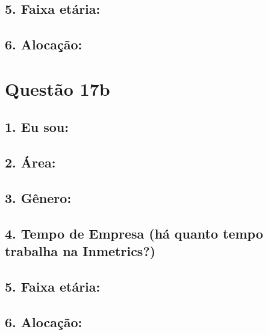 \documentclass[]{book}
\begin{document}
\hypertarget{faixa-etaria-35}{%
\subsection{5. Faixa etária:}\label{faixa-etaria-35}}

\hypertarget{alocacao-35}{%
\subsection{6. Alocação:}\label{alocacao-35}}

\hypertarget{questao-17b}{%
\section{Questão 17b}\label{questao-17b}}

\hypertarget{eu-sou-36}{%
\subsection{1. Eu sou:}\label{eu-sou-36}}

\hypertarget{area-36}{%
\subsection{2. Área:}\label{area-36}}

\hypertarget{genero-36}{%
\subsection{3. Gênero:}\label{genero-36}}

\hypertarget{tempo-de-empresa-ha-quanto-tempo-trabalha-na-inmetrics-36}{%
\subsection{4. Tempo de Empresa (há quanto tempo trabalha na Inmetrics?)}\label{tempo-de-empresa-ha-quanto-tempo-trabalha-na-inmetrics-36}}

\hypertarget{faixa-etaria-36}{%
\subsection{5. Faixa etária:}\label{faixa-etaria-36}}

\hypertarget{alocacao-36}{%
\subsection{6. Alocação:}\label{alocacao-36}}
\end{document}
